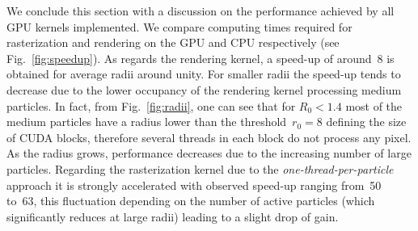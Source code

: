 \documentclass[preprint,5pt]{elsarticle}
\begin{document}
We conclude this section with a discussion on the performance achieved by all GPU kernels implemented. 
We compare computing times required for rasterization and rendering on the 
GPU and CPU respectively (see Fig.~\ref{fig:speedup}). 
As regards the rendering kernel, a speed-up of around~8 is obtained for average radii around unity. For smaller radii the speed-up
tends to decrease due to the lower occupancy of the rendering kernel processing medium particles.
In fact, from Fig.~\ref{fig:radii}, one can see that for $R_0<1.4$ most of the medium particles have a radius lower than the threshold~$r_0=8$ defining the size of CUDA blocks, therefore several threads in each block do not process any pixel.
As the radius grows, performance decreases due to the increasing number of large particles.
Regarding the rasterization kernel due to the {\it one-thread-per-particle} approach it is strongly accelerated with observed speed-up ranging from~50 to~63, this fluctuation depending on the number of active particles (which significantly reduces at large radii) leading to a slight drop of gain. 
\end{document}
